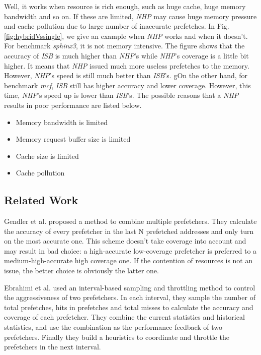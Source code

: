   Well, it works when resource is rich enough, such as huge cache, huge memory bandwidth and so on. If these are limited, \emph{NHP} may cause huge memory pressure and cache pollution due to large number of inaccurate prefetches. In Fig.\ref{fig:hybridVssingle}, we give an example when \emph{NHP} works and when it doesn't.
 For benchmark \emph{sphinx3}, it is not memory intensive. The figure shows that the accuracy of \emph{ISB} is much higher than \emph{NHP}'s while \emph{NHP}'s coverage is a little bit higher. It means that \emph{NHP} issued much more useless prefetches to the memory. However, \emph{NHP}'s speed is still much better than \emph{ISB}'s.
 gOn the other hand, for benchmark \emph{mcf}, \emph{ISB} still has higher accuracy and lower coverage. However, this time, \emph{NHP}'s speed up is lower than \emph{ISB}'s. The possible reasons that a \emph{NHP} results in poor performance are listed below.

  \begin{itemize}
    \item Memory bandwidth is limited
    \item Memory request buffer size is limited
    \item Cache size is limited
    \item Cache pollution
  \end{itemize}

  \subsection{Related Work}
  \label{sec:PrevSol}
  Gendler et al.\cite{gendlerpaper} proposed a method to combine multiple prefetchers.
  They calculate the accuracy of every prefetcher in the last N prefetched addresses and only turn on the most accurate one.
  This scheme doesn't take coverage into account and may result in bad choice: a high-accurate low-coverage prefetcher is preferred to a medium-high-accurate high coverage one.
  If the contention of resources is not an issue, the better choice is obviously the latter one. \par
  Ebrahimi et al.\cite{yalepaper} used an interval-based sampling and throttling method to control the aggressiveness of two prefetchers.
  In each interval, they sample the number of total prefetches, hits in prefetches and total misses to calculate the accuracy and coverage of each prefetcher.
  They combine the current statistics and historical statistics, and use the combination as the performance feedback of two prefetchers.
  Finally they build a heuristics to coordinate and throttle the prefetchers in the next interval.



